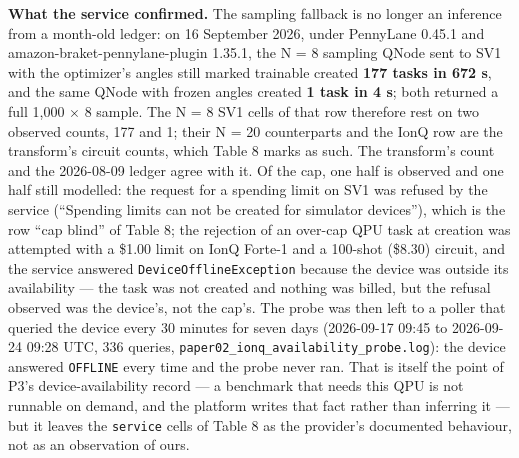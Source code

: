 \documentclass[acmsmall,screen,review]{acmart}
\begin{document}
\textbf{What the service confirmed.} The sampling fallback is no longer an inference from a month-old ledger: on 16 September 2026, under PennyLane 0.45.1 and amazon-braket-pennylane-plugin 1.35.1, the N = 8 sampling QNode sent to SV1 with the optimizer's angles still marked trainable created \textbf{177 tasks in 672 s}, and the same QNode with frozen angles created \textbf{1 task in 4 s}; both returned a full 1,000 $\times$ 8 sample. The N = 8 SV1 cells of that row therefore rest on two observed counts, 177 and 1; their N = 20 counterparts and the IonQ row are the transform's circuit counts, which Table 8 marks as such. The transform's count and the 2026-08-09 ledger agree with it. Of the cap, one half is observed and one half still modelled: the request for a spending limit on SV1 was refused by the service (``Spending limits can not be created for simulator devices''), which is the row ``cap blind'' of Table 8; the rejection of an over-cap QPU task at creation was attempted with a \$1.00 limit on IonQ Forte-1 and a 100-shot (\$8.30) circuit, and the service answered \texttt{Device\allowbreak{}Offline\allowbreak{}Exception} because the device was outside its availability --- the task was not created and nothing was billed, but the refusal observed was the device's, not the cap's. The probe was then left to a poller that queried the device every 30 minutes for seven days (2026-09-17 09:45 to 2026-09-24 09:28 UTC, 336 queries, \texttt{paper02\_\allowbreak{}ionq\_\allowbreak{}availability\_\allowbreak{}probe.\allowbreak{}log}): the device answered \texttt{OFFLINE} every time and the probe never ran. That is itself the point of P3's device-availability record --- a benchmark that needs this QPU is not runnable on demand, and the platform writes that fact rather than inferring it --- but it leaves the \texttt{service} cells of Table 8 as the provider's documented behaviour, not as an observation of ours.
\end{document}
